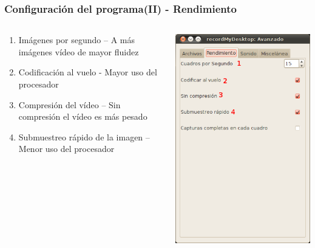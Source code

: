 \documentclass{beamer}
\begin{document}
		\begin{frame}
			\frametitle{Configuración del programa(II) - Rendimiento}
			\begin{columns}
				\begin{column}[l]{6cm}
					\justifying 
					\begin{enumerate}
						\item Imágenes por segundo -- A más imágenes vídeo de mayor fluidez
						\item Codificación al vuelo - Mayor uso del procesador
						\item Compresión del vídeo -- Sin compresión el vídeo es más pesado
						\item Submuestreo rápido de la imagen -- Menor uso del procesador 
					\end{enumerate}
				\end{column}
				\begin{column}[r]{4cm}
					\includegraphics[height=0.8\textheight, keepaspectratio=true]{Imagenes/Interfaz/03.png}
				\end{column}
			\end{columns}
		\end{frame}
\end{document}
